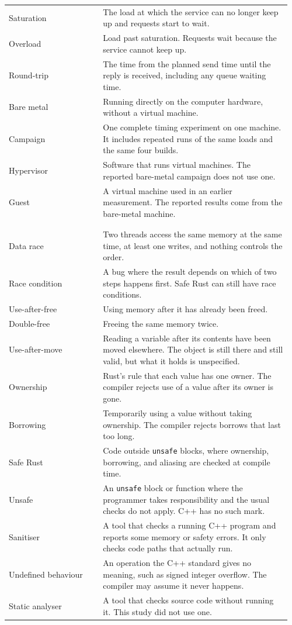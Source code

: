 \documentclass[english,oneside,a4paper,censored,csm,software-track-2020]{HYthesisML}
\begin{document}
\begin{longtable}{@{}>{\scriptsize\raggedright\arraybackslash}p{0.32\linewidth} >{\scriptsize\raggedright\arraybackslash}p{0.64\linewidth}@{}}
Saturation & The load at which the service can no longer keep up and requests start to wait. \\
Overload & Load past saturation. Requests wait because the service cannot keep up. \\
Round-trip & The time from the planned send time until the reply is received, including any queue waiting time. \\
Bare metal & Running directly on the computer hardware, without a virtual machine. \\
Campaign & One complete timing experiment on one machine. It includes repeated runs of the same loads and the same four builds. \\
Hypervisor & Software that runs virtual machines. The reported bare-metal campaign does not use one. \\
Guest & A virtual machine used in an earlier measurement. The reported results come from the bare-metal machine. \\
\\[2pt]
\multicolumn{2}{@{}l}{\scriptsize\emph{Safety}}\\*[1pt]
Data race & Two threads access the same memory at the same time, at least one writes, and nothing controls the order. \\
Race condition &  A bug where the result depends on which of two steps happens first. Safe Rust can still have race conditions. \\
Use-after-free & Using memory after it has already been freed. \\
Double-free & Freeing the same memory twice. \\
Use-after-move & Reading a variable after its contents have been moved elsewhere. The object is still there and still valid, but what it holds is unspecified. \\
Ownership & Rust’s rule that each value has one owner. The compiler rejects use of a value after its owner is gone. \\
Borrowing & Temporarily using a value without taking ownership. The compiler rejects borrows that last too long. \\
Safe Rust & Code outside \texttt{unsafe} blocks, where ownership, borrowing, and aliasing are checked at compile time. \\
Unsafe & An \texttt{unsafe} block or function where the programmer takes responsibility and the usual checks do not apply. C++ has no such mark. \\
Sanitiser & A tool that checks a running C++ program and reports some memory or safety errors. It only checks code paths that actually run. \\
Undefined behaviour & An operation the C++ standard gives no meaning, such as signed integer overflow. The compiler may assume it never happens. \\
Static analyser & A tool that checks source code without running it. This study did not use one. \\
\hline
\end{longtable}
\endgroup
\end{document}
